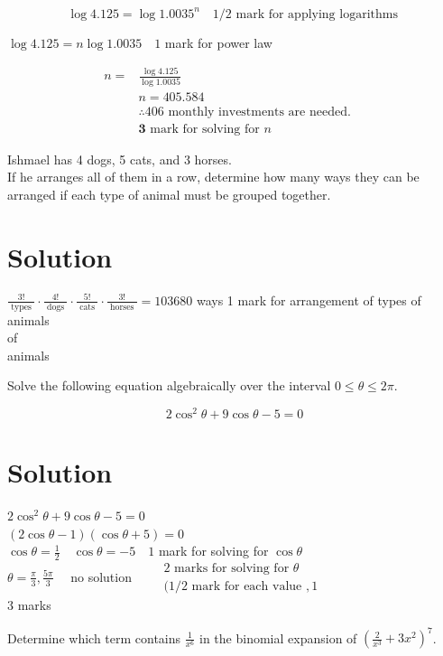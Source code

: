 \documentclass[10pt]{article}
\begin{document}
$$
\log 4.125=\log 1.0035^{n} \quad 1 / 2 \text { mark for applying logarithms }
$$

$\log 4.125=n \log 1.0035 \quad 1$ mark for power law

$$
\begin{array}{rlr}
n= & \frac{\log 4.125}{\log 1.0035} & \\
& n=405.584 & \\
& \therefore 406 \text { monthly investments are needed. } & \\
& \mathbf{3} \text { mark for solving for } n
\end{array}
$$

Ishmael has 4 dogs, 5 cats, and 3 horses.\\
If he arranges all of them in a row, determine how many ways they can be arranged if each type of animal must be grouped together.

\section*{Solution}
$\frac{3!}{\text { types }} \cdot \frac{4!}{\text { dogs }} \cdot \frac{5!}{\text { cats }} \cdot \frac{3!}{\text { horses }}=103680$ ways 1 mark for arrangement of types of animals\\
of\\
animals

Solve the following equation algebraically over the interval $0 \leq \theta \leq 2 \pi$.

$$
2 \cos ^{2} \theta+9 \cos \theta-5=0
$$

\section*{Solution}
$2 \cos ^{2} \theta+9 \cos \theta-5=0$\\
$(2 \cos \theta-1)(\cos \theta+5)=0$\\
$\cos \theta=\frac{1}{2} \quad \cos \theta=-5 \quad 1$ mark for solving for $\cos \theta$\\
$\theta=\frac{\pi}{3}, \frac{5 \pi}{3} \quad$ no solution $\quad \begin{aligned} & 2 \text { marks for solving for } \theta \\ & (1 / 2 \text { mark for each value }, 1\end{aligned}$\\
3 marks

Determine which term contains $\frac{1}{x^{6}}$ in the binomial expansion of $\left(\frac{2}{x^{3}}+3 x^{2}\right)^{7}$.
\end{document}

